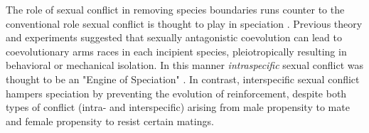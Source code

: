 \documentclass[11pt]{article}
\begin{document}

The role of sexual conflict in removing species boundaries runs counter to the conventional role sexual conflict is thought to play in speciation  \citep[][]{GavriletsWaxman,RiceandHistert,ParkerPartrdige}. 
Previous theory \citep{GavriletsWaxman} and experiments \citep{Rice1996Nature} suggested that sexually antagonistic coevolution can lead to coevolutionary arms races in each incipient species, pleiotropically resulting in behavioral or mechanical isolation. 
In this manner \emph{intraspecific} sexual conflict was thought to be an "Engine of Speciation" \citep[e.g. ][]{RiceandHistert}.  
In contrast, interspecific sexual conflict hampers speciation by preventing the evolution of reinforcement, despite both types of conflict (intra- and interspecific) arising from male propensity to mate and female propensity to resist certain matings. 
\end{document}
